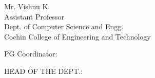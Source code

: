 \noindent
\begin{minipage}[t]{0.65\linewidth}
\begin{flushleft}
\begin{singlespace}
Mr. Vishnu K.\\
Assistant Professor\\
Dept. of Computer Science and Engg.\\
Cochin College of Engineering and Technology\\
\end{singlespace}
 \end{flushleft}
 \end{minipage}
\hfill
\noindent
\begin{minipage}[t]{0.7\linewidth}
\begin{flushleft}
\end{flushleft}
\end{minipage}

\vspace{.5cm}
\noindent
\begin{minipage}[t]{0.7\linewidth}
 \begin{flushleft}
PG Coordinator:
 \end{flushleft}
 \end{minipage}
\hfill
\noindent
 \begin{minipage}[t]{0.5\linewidth}
\begin{flushleft}
HEAD OF THE DEPT.:\\
\end{flushleft}
\end{minipage}



